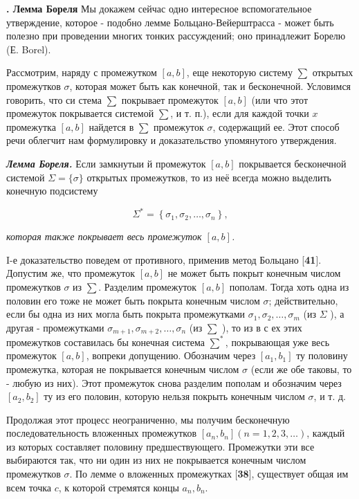 \documentclass[10pt, twoside]{article}
\newcounter{subtopic}
\newcommand{\subtopic}[1]{%
  \stepcounter{subtopic}%
  \gdef\thesubtopic{\arabic{subtopic}}
  \textbf{\arabic{subtopic}. #1}
}
\begin{document}
\subtopic{Лемма Бореля} Мы докажем сейчас одно интересное вспомогательное утверждение, которое - подобно лемме Больцано-Вейерштрасса - может быть полезно при проведении многих тонких рассуждений; оно принадлежит Борелю (Е. Borel).


Рассмотрим, наряду с промежутком $[a, b]$, еще некоторую систему $\sum$ открытых промежутков $\sigma$, которая может быть как конечной, так и бесконечной. Условимся говорить, что си стема $\sum$ покрывает промежуток $[a, b]$ (или что этот промежуток покрывается системой $\sum$, и т. п.), если для каждой точки $x$ промежутка $[a, b]$ найдется в $\sum$ промежуток $\sigma$, содержащий ее. Этот способ речи облегчит нам формулировку и доказательство упомянутого утверждения.

\textit{\textbf{Лемма Бореля.}} Если замкнутыи й промежуток $[a, b]$ покрывается бесконечной системой $\Sigma=\{\sigma\}$ открытых промежутков, то из неё всегда можно выделить конечную подсистему

$$
  \Sigma^{*}=\left\{\sigma_{1}, \sigma_{2}, \ldots, \sigma_{n}\right\},
$$

\textit{которая также покрывает весь промежуток $[a, b]$.}

I-е доказательство поведем от противного, применив метод Больцано [\textbf{41}]. Допустим же, что промежуток $[a, b]$ не может быть покрыт конечным числом промежутков $\sigma$ из $\sum$. Разделим промежуток $[a, b]$ пополам. Тогда хоть одна из половин его тоже не может быть покрыта конечным числом $\sigma$; действительно, если бы одна из них могла быть покрыта промежутками $\sigma_{1}, \sigma_{2}, \ldots, \sigma_{m}$ (из $\Sigma$ ), а другая - промежутками $\sigma_{m+1}, \sigma_{m+2}, \ldots, \sigma_{n}$ (из $\sum$ ), то из в с ех этих промежутков составилась бы конечная система $\sum^{*}$, покрывающая уже весь промежуток $[a, b]$, вопреки допущению. Обозначим через $\left[a_{1}, b_{1}\right]$ ту половину промежутка, которая не покрывается конечным числом $\sigma$ (если же обе таковы, то - любую из них). Этот промежуток снова разделим пополам и обозначим через $\left[a_{2}, b_{2}\right]$ ту из его половин, которую нельзя покрыть конечным числом $\sigma$, и т. д.

  Продолжая этот процесс неограниченно, мы получим бесконечную последовательность вложенных промежутков $\left[a_{n}, b_{n}\right](n=1,2,3, \ldots)$, каждый из которых составляет половину предшествующего. Промежутки эти все выбираются так, что ни один из них не покрывается конечным числом промежутков $\sigma$. По лемме о вложенных промежутках [\textbf{38}], существует общая им всем точка $c$, к которой стремятся концы $a_{n}, b_{n}$.
\end{document}
